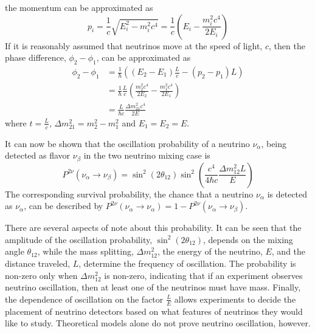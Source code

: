 the momentum can be approximated as
\begin{equation}
	p_i = \frac{1}{c}\sqrt{E^2_i-m^2_ic^4 } = \frac{1}{c}\left(E_i - \frac{m^2_ic^4}{2E_i} \right)
\end{equation}
If it is reasonably assumed that neutrinos move at the speed of light, $c$, then
the phase difference, $\phi_2 - \phi_1$, can be approximated as
\begin{equation}
\begin{split}
	\phi_2 - \phi_1 &= \frac{1}{\hbar}\left( (E_2 - E_1)\frac{L}{c} - (p_2 - p_1)L  \right)\\
	&=\frac{1}{\hbar}\frac{L}{c}\left(\frac{m_2^2c^4}{2E_2} - \frac{m_1^2c^4}{2E_1}\right) \\
	&=\frac{L}{\hbar c}\frac{\Delta m^2_{21}c^4}{2E}
\end{split}
\end{equation}
where $t = \frac{L}{c}$, $\Delta m^2_{21} = m_2^2 - m_1^2$ and $E_1 = E_2 = E$.

It can now be shown that the oscillation probability of a neutrino $\nu_\alpha$, being detected as flavor $\nu_\beta$ in the two neutrino mixing case is
\begin{equation} \label{eq:oscprob}
	P^{2\nu}(\nu_\alpha \rightarrow \nu_\beta) = \sin^2\left(2\theta_{12}\right)\sin^2\left(\frac{c^4}{4\hbar c}\frac{\Delta m^2_{12}L}{E}\right) 
\end{equation}
The corresponding survival probability, the chance that a neutrino $\nu_\alpha$ is detected as $\nu_\alpha$, can be described by $P^{2\nu}(\nu_\alpha \rightarrow \nu_\alpha) = 1 - P^{2\nu}(\nu_\alpha \rightarrow \nu_\beta)$.

There are several aspects of note about this probability. It can be seen that the amplitude of the oscillation probability, $\sin^2\left(2\theta_{12}\right)$, depends on the mixing angle $\theta_{12}$, while the mass splitting, $\Delta m^2_{12}$, the energy of the neutrino, $E$, and the distance traveled, $L$, determine the frequency of oscillation. 
The probability is non-zero only when $\Delta m^2_{12}$ is non-zero, indicating that if an experiment observes neutrino oscillation, then at least one of the neutrinos must have mass.
Finally, the dependence of oscillation on the factor $\frac{L}{E}$ allows experiments to decide the placement of neutrino detectors based on what features of neutrinos they would like to study. 
Theoretical models alone do not prove neutrino oscillation, however.

